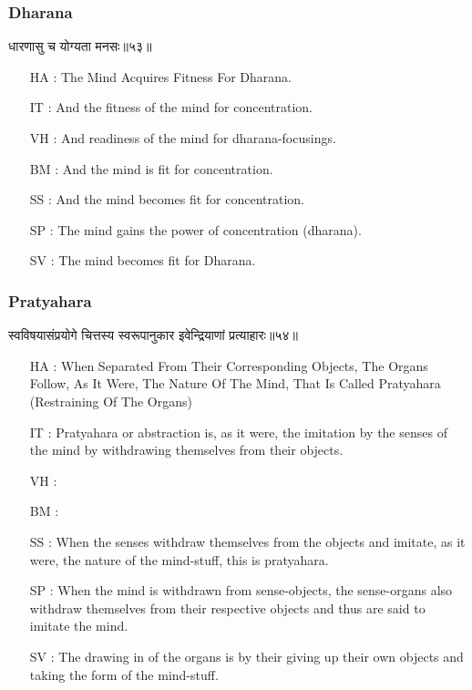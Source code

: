 \begin{frame}[fragile]\frametitle{Dharana}
\begin{sanskrit}
धारणासु च योग्यता मनसः॥५३॥
\end{sanskrit}

	\begin{itemize}
	\item [HA]: The Mind Acquires Fitness For Dharana.
	\item [IT]: And the fitness of the mind for concentration.
	\item [VH]: And readiness of the mind for dharana-focusings.
	\item [BM]: And the mind is fit for concentration.
	\item [SS]: And the mind becomes fit for concentration.
	\item [SP]: The mind gains the power of concentration (dharana).
	\item [SV]: The mind becomes fit for Dharana. 
	\end{itemize}
\end{frame}

\begin{frame}[fragile]\frametitle{Pratyahara}
\begin{sanskrit}
स्वविषयासंप्रयोगे चित्तस्य स्वरूपानुकार इवेन्द्रियाणां प्रत्याहारः॥५४॥
\end{sanskrit}

	\begin{itemize}
	\item [HA]: When Separated From Their Corresponding Objects, The Organs Follow, As It Were, The Nature Of The Mind, That Is Called Pratyahara (Restraining Of The Organs)
	\item [IT]: Pratyahara or abstraction is, as it were, the imitation by the senses of the mind by withdrawing themselves from their objects.
	\item [VH]: 
	\item [BM]: 
	\item [SS]: When the senses withdraw themselves from the objects and imitate, as it were, the nature of the mind-stuff, this is pratyahara.
	\item [SP]: When the mind is withdrawn from sense-objects, the sense-organs also withdraw themselves from their respective objects and thus are said to imitate the mind.
	\item [SV]: The drawing in of the organs is by their giving up their own objects and taking the form of the mind-stuff.
	\end{itemize}
\end{frame}


